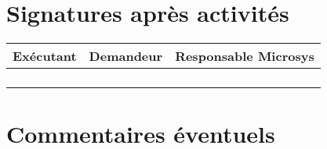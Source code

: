 \section{Signatures après activités}

\begin{center}
	\begin{tabular}{|c|c|c|}
        \hline
        Exécutant & Demandeur & Responsable Microsys \\
        \hline
         \hspace{4.5cm} & \hspace{4.5cm} & \hspace{4.5cm} \\
        &&\\
        &&\\
        &&\\
        \hline
	\end{tabular}
\end{center}

\section{Commentaires éventuels}

